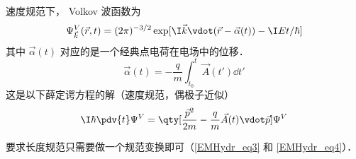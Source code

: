 
速度规范下， Volkov 波函数为
 \begin{equation}
\Psi_{\vec k}^V(\vec r, t) = (2\pi)^{-3/2} \exp[\I \vec k \vdot (\vec r - \vec \alpha(t)) - \I Et/\hbar]
\end{equation}
其中 $\vec \alpha(t)$ 对应的是一个经典点电荷在电场中的位移．
\begin{equation}
\vec \alpha(t) = -\frac{q}{m} \int_{t_0}^t \vec A(t') \dd{t'}
\end{equation}
这是以下薛定谔方程的解（速度规范，偶极子近似）
\begin{equation}
\I\hbar \pdv{t} \Psi^V = \qty[\frac{\vec p^2}{2m} - \frac{q}{m}\vec A(t) \vdot \vec p] \Psi^V
\end{equation}

要求长度规范只需要做一个规范变换即可（\autoref{EMHydr_eq3} 和 \autoref{EMHydr_eq4}）．
